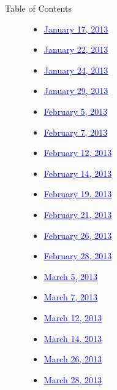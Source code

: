 \documentclass[11pt, letterpaper]{report}
\begin{document}
\begin{description}

\setcounter{page}{1}

\item[\Large{Table of Contents}] \hfill  
\begin{itemize}
\item \hyperlink{January 17, 2013}{\textcolor{blue}{\underline{January 17, 2013}}} 
\item \hyperlink{January 22, 2013}{\textcolor{blue}{\underline{January 22, 2013}}} 
\item \hyperlink{January 24, 2013}{\textcolor{blue}{\underline{January 24, 2013}}} 
\item \hyperlink{January 29, 2013}{\textcolor{blue}{\underline{January 29, 2013}}} 
\item \hyperlink{February 5, 2013}{\textcolor{blue}{\underline{February 5, 2013}}} 
\item \hyperlink{February 7, 2013}{\textcolor{blue}{\underline{February 7, 2013}}} 
\item \hyperlink{February 12, 2013}{\textcolor{blue}{\underline{February 12, 2013}}} 
\item \hyperlink{February 14, 2013}{\textcolor{blue}{\underline{February 14, 2013}}} 
\item \hyperlink{February 19, 2013}{\textcolor{blue}{\underline{February 19, 2013}}} 
\item \hyperlink{February 21, 2013}{\textcolor{blue}{\underline{February 21, 2013}}} 
\item \hyperlink{February 26, 2013}{\textcolor{blue}{\underline{February 26, 2013}}} 
\item \hyperlink{February 28, 2013}{\textcolor{blue}{\underline{February 28, 2013}}} 
\item \hyperlink{March 5, 2013}{\textcolor{blue}{\underline{March 5, 2013}}} 
\item \hyperlink{March 7, 2013}{\textcolor{blue}{\underline{March 7, 2013}}} 
\item \hyperlink{March 12, 2013}{\textcolor{blue}{\underline{March 12, 2013}}} 
\item \hyperlink{March 14, 2013}{\textcolor{blue}{\underline{March 14, 2013}}} 
\item \hyperlink{March 26, 2013}{\textcolor{blue}{\underline{March 26, 2013}}} 
\item \hyperlink{March 28, 2013}{\textcolor{blue}{\underline{March 28, 2013}}} 

\end{itemize}
\end{description}
\end{document}
